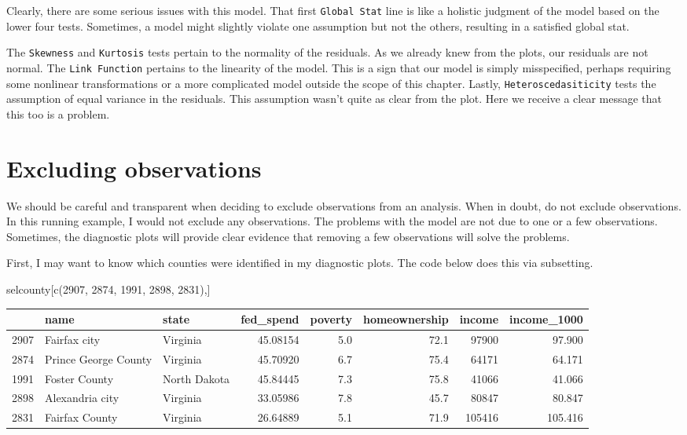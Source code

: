 \documentclass[
]{book}
\makeatletter
\newenvironment{Shaded}{\begin{snugshade}}{\end{snugshade}}
\newcommand{\DecValTok}[1]{\textcolor[rgb]{0.06,0.06,0.06}{#1}}
\newcommand{\FunctionTok}[1]{\textcolor[rgb]{0,0,0}{#1}}
\newcommand{\NormalTok}[1]{#1}
\newenvironment{kframe}{%
\medskip{}
\setlength{\fboxsep}{.8em}
 \def\at@end@of@kframe{}%
 \ifinner\ifhmode%
  \def\at@end@of@kframe{\end{minipage}}%
  \begin{minipage}{\columnwidth}%
 \fi\fi%
 \def\FrameCommand##1{\hskip\@totalleftmargin \hskip-\fboxsep
 \colorbox{shadecolor}{##1}\hskip-\fboxsep
     \hskip-\linewidth \hskip-\@totalleftmargin \hskip\columnwidth}%
 \MakeFramed {\advance\hsize-\width
   \@totalleftmargin\z@ \linewidth\hsize
   \@setminipage}}%
 {\par\unskip\endMakeFramed%
 \at@end@of@kframe}
\renewenvironment{Shaded}{\begin{kframe}}{\end{kframe}}
\makeatother
\begin{document}
Clearly, there are some serious issues with this model. That first \texttt{Global\ Stat} line is like a holistic judgment of the model based on the lower four tests. Sometimes, a model might slightly violate one assumption but not the others, resulting in a satisfied global stat.

The \texttt{Skewness} and \texttt{Kurtosis} tests pertain to the normality of the residuals. As we already knew from the plots, our residuals are not normal. The \texttt{Link\ Function} pertains to the linearity of the model. This is a sign that our model is simply misspecified, perhaps requiring some nonlinear transformations or a more complicated model outside the scope of this chapter. Lastly, \texttt{Heteroscedasiticity} tests the assumption of equal variance in the residuals. This assumption wasn't quite as clear from the plot. Here we receive a clear message that this too is a problem.

\hypertarget{excluding-observations}{%
\section{Excluding observations}\label{excluding-observations}}

We should be careful and transparent when deciding to exclude observations from an analysis. When in doubt, do not exclude observations. In this running example, I would not exclude any observations. The problems with the model are not due to one or a few observations. Sometimes, the diagnostic plots will provide clear evidence that removing a few observations will solve the problems.

First, I may want to know which counties were identified in my diagnostic plots. The code below does this via subsetting.

\begin{Shaded}
\begin{Highlighting}[]
\NormalTok{selcounty[}\FunctionTok{c}\NormalTok{(}\DecValTok{2907}\NormalTok{, }\DecValTok{2874}\NormalTok{, }\DecValTok{1991}\NormalTok{, }\DecValTok{2898}\NormalTok{, }\DecValTok{2831}\NormalTok{),]}
\end{Highlighting}
\end{Shaded}

\begin{tabular}{l|l|l|r|r|r|r|r}
\hline
  & name & state & fed\_spend & poverty & homeownership & income & income\_1000\\
\hline
2907 & Fairfax city & Virginia & 45.08154 & 5.0 & 72.1 & 97900 & 97.900\\
\hline
2874 & Prince George County & Virginia & 45.70920 & 6.7 & 75.4 & 64171 & 64.171\\
\hline
1991 & Foster County & North Dakota & 45.84445 & 7.3 & 75.8 & 41066 & 41.066\\
\hline
2898 & Alexandria city & Virginia & 33.05986 & 7.8 & 45.7 & 80847 & 80.847\\
\hline
2831 & Fairfax County & Virginia & 26.64889 & 5.1 & 71.9 & 105416 & 105.416\\
\hline
\end{tabular}
\end{document}
